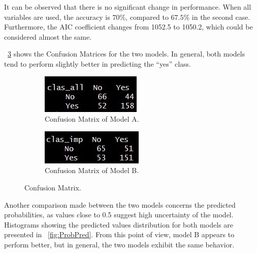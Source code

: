 It can be observed that there is no significant change in performance. When all variables are used, the accuracy is $70\%$, compared to $67.5\%$ in the second case. Furthermore, the AIC coefficient changes from 1052.5 to 1050.2, which could be considered almost the same. 

\Fig~\ref{fig:CM} shows the Confusion Matrices for the two models. In general, both models tend to perform slightly better in predicting the ``yes'' class.

\begin{figure}[h]
	\begin{subfigure}{.6\textwidth}
		\centering
		\includegraphics[width=0.7\linewidth]{ImageFiles/Classification/LogReg/log_reg_tt_all_pred_table}
		\caption{Confusion Matrix of Model A.}
		\label{fig:CMA}
	\end{subfigure}
	\begin{subfigure}{.6\textwidth}
		\centering
		\includegraphics[width=0.7\linewidth]{ImageFiles/Classification/LogReg/log_reg_tt_imp_pred_table}
		\caption{Confusion Matrix of Model B.}
		\label{fig:CMB}
	\end{subfigure}
	\caption{Confusion Matrix.}
	\label{fig:CM}
\end{figure}

Another comparison made between the two models concerns the predicted probabilities, as values close to 0.5 suggest high uncertainty of the model. Histograms showing the predicted values distribution for both models are presented in \Fig~\ref{fig:ProbPred}. From this point of view, model B appears to perform better, but in general, the two models exhibit the same behavior.

